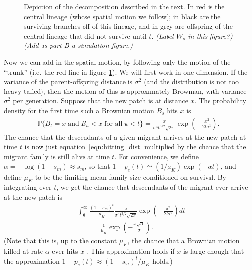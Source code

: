 \documentclass{article}
\renewcommand{\P}{\mathbb{P}}
\newcommand{\deq}{\stackrel{\scriptscriptstyle{d}}{=}}
\newcommand{\plr}[1]{{\it\color{blue}(#1)}}
\begin{document}
\begin{figure}[ht!!]
  \begin{center}
  
  \end{center}
\caption{Depiction of the decomposition described in the text.
In red is the central lineage (whose spatial motion we follow);
in black are the surviving branches off of this lineage, 
and in grey are offspring of the central lineage that did not survive until $t$.
\plr{Label $W_s$ in this figure?}
\plr{Add as part B a simulation figure.}
\label{fig:branching_decomp}
}
\end{figure}

Now we can add in the spatial motion, by following only the motion of the ``trunk''
(i.e.\ the red line in figure \ref{fig:branching_decomp}).
We will first work in one dimension.
If the variance of the parent-offspring distance is $\sigma^2$ (and the distribution is not too heavy-tailed),
then the motion of this is approximately Brownian, with variance $\sigma^2$ per generation.
Suppose that the new patch is at distance $x$.
The probability density for the first time such a Brownian motion $B_s$ hits $x$ is
\citep[XXX]{feller}
\begin{align} \label{eqn:hitting_dist}
  \P\{ B_t=x \;\mbox{and} \; B_u<x \;\mbox{for all}\; u<t\} =  \frac{x}{\sigma^3 t^{3/2}\sqrt{2\pi}} \exp\left(-\frac{x^2}{2t\sigma^2}\right) .
\end{align}
The chance that the descendants of a given migrant arrives at the new patch at time $t$
is now just equation~\eqref{eqn:hitting_dist} multiplied by the chance that 
the migrant family is still alive at time $t$.
For convenience, we define $\alpha = - \log(1-s_m) \approx s_m$,
so that $1-p_e(t) \simeq (1/\mu_K) \exp(-\alpha t)$,
and define $\mu_K$ to be the limiting mean family size conditioned on survival.
By integrating over $t$, we get the chance that descendants of the migrant ever arrive at the new patch is
\begin{align} \label{eqn:estab_prob}
  & \int_0^\infty \frac{(1-s_m)^t}{\mu_K} \frac{x}{\sigma^3 t^{3/2}\sqrt{2\pi}} \exp\left(-\frac{x^2}{2t\sigma^2}\right)  dt \\
  & \qquad = \frac{1}{\mu_K} \exp\left( - \frac{ x \sqrt{\alpha}}{\sigma} \right) .
\end{align}
(Note that this is, up to the constant $\mu_K$, the chance that a Brownian motion killed at rate $\alpha$
ever hits $x$ \citep{feller}.
This approximation holds if $x$ is large enough that the approximation $1-p_e(t) \approx (1-s_m)^t/\mu_K$ holds.)
\end{document}
